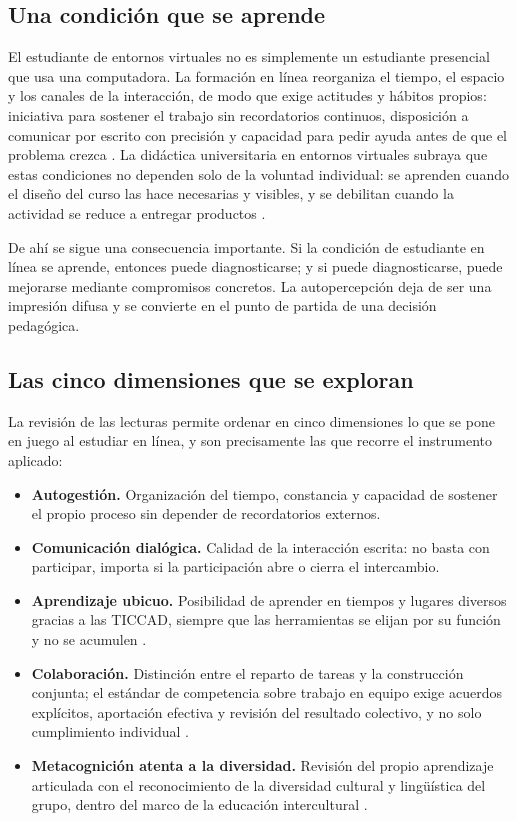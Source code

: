 \documentclass[
  spanish,
  letterpaper, oneside
]{article}
\begin{document}
\subsection{Una condición que se aprende}

El estudiante de entornos virtuales no es simplemente un estudiante presencial que
usa una computadora. La formación en línea reorganiza el tiempo, el espacio y los
canales de la interacción, de modo que exige actitudes y hábitos propios: iniciativa
para sostener el trabajo sin recordatorios continuos, disposición a comunicar por
escrito con precisión y capacidad para pedir ayuda antes de que el problema crezca
\citep{borges2007estudiante}. La didáctica universitaria en entornos virtuales
subraya que estas condiciones no dependen solo de la voluntad individual: se aprenden
cuando el diseño del curso las hace necesarias y visibles, y se debilitan cuando la
actividad se reduce a entregar productos \citep{bautista2016didactica}.

De ahí se sigue una consecuencia importante. Si la condición de estudiante en línea
se aprende, entonces puede diagnosticarse; y si puede diagnosticarse, puede mejorarse
mediante compromisos concretos. La autopercepción deja de ser una impresión difusa y
se convierte en el punto de partida de una decisión pedagógica.

\subsection{Las cinco dimensiones que se exploran}

La revisión de las lecturas permite ordenar en cinco dimensiones lo que se pone en
juego al estudiar en línea, y son precisamente las que recorre el instrumento
aplicado:

\begin{itemize}[leftmargin=1.6em,itemsep=0.35em]
  \item \textbf{Autogestión.} Organización del tiempo, constancia y capacidad de
  sostener el propio proceso sin depender de recordatorios externos.
  \item \textbf{Comunicación dialógica.} Calidad de la interacción escrita: no basta
  con participar, importa si la participación abre o cierra el intercambio.
  \item \textbf{Aprendizaje ubicuo.} Posibilidad de aprender en tiempos y lugares
  diversos gracias a las TICCAD, siempre que las herramientas se elijan por su función
  y no se acumulen \citep{zambranoPilay2020tecnologias}.
  \item \textbf{Colaboración.} Distinción entre el reparto de tareas y la construcción
  conjunta; el estándar de competencia sobre trabajo en equipo exige acuerdos
  explícitos, aportación efectiva y revisión del resultado colectivo, y no solo
  cumplimiento individual \citep{conocer2025ec0554}.
  \item \textbf{Metacognición atenta a la diversidad.} Revisión del propio aprendizaje
  articulada con el reconocimiento de la diversidad cultural y lingüística del grupo,
  dentro del marco de la educación intercultural \citep{aguadoSleeter2021educacion}.
\end{itemize}
\end{document}
